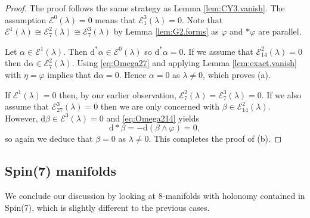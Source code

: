 \documentclass{article}
\theoremstyle{definition}
\numberwithin{thm}{section}
\numberwithin{equation}{section}
\def\d{\mathrm{d}}
\begin{document}
\begin{proof}  The proof follows the same strategy as Lemma \ref{lem:CY3.vanish}.  The assumption $\mathcal{E}^0(\lambda)=0$ means that $\mathcal{E}^3_1(\lambda)=0$.  Note that $\mathcal{E}^1(\lambda)\cong\mathcal{E}^2_7(\lambda)\cong\mathcal{E}^3_7(\lambda)$ by Lemma \ref{lem:G2.forms} as $\varphi$ and $*\varphi$ are parallel.

Let $\alpha\in\mathcal{E}^1(\lambda)$.  Then $\d^*\alpha\in\mathcal{E}^0(\lambda)$ so $\d^*\alpha=0$.  If we assume that $\mathcal{E}^2_{14}(\lambda)=0$ then $\d\alpha\in\mathcal{E}^2_7(\lambda)$.  Using \eqref{eq:Omega27} and applying Lemma \ref{lem:exact.vanish} with $\eta=\varphi$ implies that $\d\alpha=0$.  
 Hence $\alpha=0$ as $\lambda\neq 0$, which proves (a).

If $\mathcal{E}^1(\lambda)=0$ then, by our earlier observation,  %
$\mathcal{E}^2_7(\lambda)=\mathcal{E}^3_7(\lambda)=0$.  If we also assume that $\mathcal{E}^3_{27}(\lambda)=0$ then we are only concerned with $\beta\in\mathcal{E}^2_{14}(\lambda)$.  However, $\d\beta\in\mathcal{E}^3(\lambda)=0$ and \eqref{eq:Omega214} yields
\begin{equation}
\d*\beta=-\d(\beta\wedge\varphi)=0,
\end{equation}
so again we deduce that $\beta=0$ as $\lambda\neq 0$.  This completes the proof of (b).
\end{proof}

\subsection{Spin(7) manifolds}

We conclude our discussion by looking at 8-manifolds with holonomy contained in Spin(7), which is slightly different to the previous cases.
\end{document}
